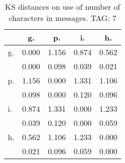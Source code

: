 \begin{table}[h!]
\begin{center}
\begin{tabular}{| l | c | c | c | c |}\hline
 & g. & p. & i. & h. \\\hline
g. & 0.000  & 1.156  & 0.874  & 0.562 \\\hline
 & 0.000  & 0.098  & 0.039  & 0.021 \\\hline
p. & 1.156  & 0.000  & 1.331  & 1.106 \\\hline
 & 0.098  & 0.000  & 0.120  & 0.096 \\\hline
i. & 0.874  & 1.331  & 0.000  & 1.233 \\\hline
 & 0.039  & 0.120  & 0.000  & 0.059 \\\hline
h. & 0.562  & 1.106  & 1.233  & 0.000 \\\hline
 & 0.021  & 0.096  & 0.059  & 0.000 \\\hline
\end{tabular}
\caption{KS distances on use of number of characters in messages. TAG: 7}
\end{center}
\end{table}